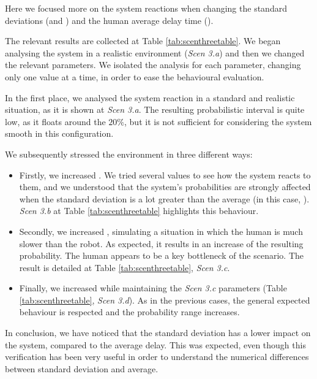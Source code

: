 Here we focused more on the system reactions when changing the standard deviations (\vH \space and \vT) and the human average delay time (\mH).

The relevant results are collected at Table \ref{tab:scenthreetable}. We began analysing the system in a realistic environment (\emph{Scen 3.a}) and then we changed the relevant parameters. We isolated the analysis for each parameter, changing only one value at a time, in order to ease the behavioural evaluation.

In the first place, we analysed the system reaction in a standard and realistic situation, as it is shown at \emph{Scen 3.a}. The resulting probabilistic interval is quite low, as it floats around the $20\%$, but it is not sufficient for considering the system smooth in this configuration.

We subsequently stressed the environment in three different ways:
\begin{itemize}
    \item Firstly, we increased \vT. We tried several values to see how the system reacts to them, and we understood that the system's probabilities are strongly affected when the standard deviation is a lot greater than the average (in this case, \mT). \emph{Scen 3.b} at Table \ref{tab:scenthreetable} highlights this behaviour.
    \item Secondly, we increased \mH, simulating a situation in which the human is much slower than the robot. As expected, it results in an increase of the resulting probability. The human appears to be a key bottleneck of the scenario. The result is detailed at Table \ref{tab:scenthreetable}, \emph{Scen 3.c}.
    \item Finally, we increased \vH while maintaining the \emph{Scen 3.c} parameters (Table \ref{tab:scenthreetable}, \emph{Scen 3.d}). As in the previous cases, the general expected behaviour is respected and the probability range increases.
\end{itemize}

In conclusion, we have noticed that the standard deviation has a lower impact on the system, compared to the average delay. This was expected, even though this verification has been very useful in order to understand the numerical differences between standard deviation and average.